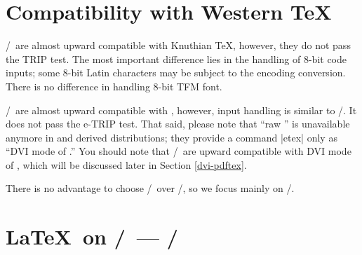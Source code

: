 \documentclass[a4paper,11pt,dvipdfmx]{article}
\let\emph=\origemph
\begin{document}
\section{Compatibility with Western \TeX}\label{compat}

\pTeX/\upTeX\ are almost upward compatible with Knuthian \TeX,
however, they do not pass the TRIP test.
The most important difference lies in the handling of 8-bit code inputs;
some 8-bit Latin characters may be subject to the encoding conversion.
There is no difference in handling 8-bit TFM font.

\epTeX/\eupTeX\ are almost upward compatible with \eTeX,
however, input handling is similar to \pTeX/\upTeX.
It does not pass the e-TRIP test.
That said, please note that ``raw \eTeX'' is unavailable anymore
in \TL and derived distributions;
they provide a command |etex| only as ``DVI mode of \pdfTeX.''
You should note that
\epTeX/\eupTeX\ are \emph{not} upward compatible with DVI mode of \pdfTeX,
which will be discussed later in Section \ref{dvi-pdftex}.

There is no advantage to choose \pTeX/\upTeX\ over \epTeX/\eupTeX,
so we focus mainly on \epTeX/\eupTeX.

\section{\LaTeX\ on \pTeX/\upTeX\ --- \pLaTeX/\upLaTeX}
\end{document}
